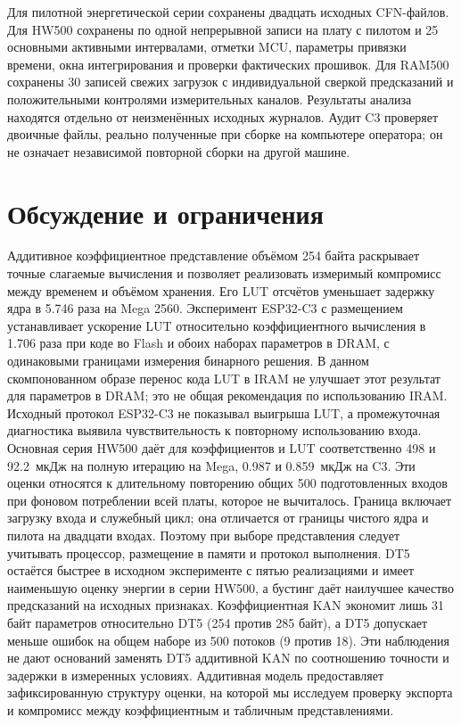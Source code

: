 Для пилотной энергетической серии сохранены двадцать исходных CFN-файлов. Для HW500 сохранены по одной непрерывной записи на плату с пилотом и 25 основными активными интервалами, отметки MCU, параметры привязки времени, окна интегрирования и проверки фактических прошивок. Для RAM500 сохранены 30 записей свежих загрузок с индивидуальной сверкой предсказаний и положительными контролями измерительных каналов. Результаты анализа находятся отдельно от неизменённых исходных журналов. Аудит C3 проверяет двоичные файлы, реально полученные при сборке на компьютере оператора; он не означает независимой повторной сборки на другой машине.

\section{Обсуждение и ограничения}
Аддитивное коэффициентное представление объёмом 254 байта раскрывает точные слагаемые вычисления и позволяет реализовать измеримый компромисс между временем и объёмом хранения. Его LUT отсчётов уменьшает задержку ядра в 5.746 раза на Mega 2560. Эксперимент ESP32-C3 с размещением устанавливает ускорение LUT относительно коэффициентного вычисления в 1.706 раза при коде во Flash и обоих наборах параметров в DRAM, с одинаковыми границами измерения бинарного решения. В данном скомпонованном образе перенос кода LUT в IRAM не улучшает этот результат для параметров в DRAM; это не общая рекомендация по использованию IRAM. Исходный протокол ESP32-C3 не показывал выигрыша LUT, а промежуточная диагностика выявила чувствительность к повторному использованию входа. Основная серия HW500 даёт для коэффициентов и LUT соответственно 498 и 92.2~мкДж на полную итерацию на Mega, 0.987 и 0.859~мкДж на C3. Эти оценки относятся к длительному повторению общих 500 подготовленных входов при фоновом потреблении всей платы, которое не вычиталось. Граница включает загрузку входа и служебный цикл; она отличается от границы чистого ядра и пилота на двадцати входах. Поэтому при выборе представления следует учитывать процессор, размещение в памяти и протокол выполнения. DT5 остаётся быстрее в исходном эксперименте с пятью реализациями и имеет наименьшую оценку энергии в серии HW500, а бустинг даёт наилучшее качество предсказаний на исходных признаках. Коэффициентная KAN экономит лишь 31 байт параметров относительно DT5 (254 против 285 байт), а DT5 допускает меньше ошибок на общем наборе из 500 потоков (9 против 18). Эти наблюдения не дают оснований заменять DT5 аддитивной KAN по соотношению точности и задержки в измеренных условиях. Аддитивная модель предоставляет зафиксированную структуру оценки, на которой мы исследуем проверку экспорта и компромисс между коэффициентным и табличным представлениями.

